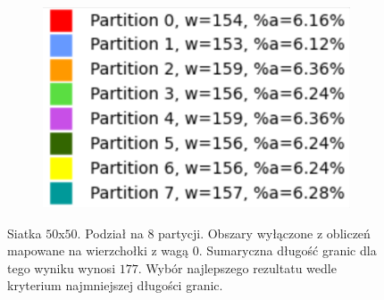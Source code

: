 \begin{figure}[h]
\begin{subfigure}{.33\textwidth}
    \caption[short]{}
\end{subfigure}%
\begin{subfigure}{.33\textwidth}
    \centering
    \includegraphics[width=0.9\linewidth]{images/results/m_k/with/4/results}
    \caption[short]{}
\end{subfigure}
\caption{Siatka $50$x$50$. Podział na $8$ partycji. Obszary wyłączone z obliczeń mapowane na wierzchołki z wagą $0$.
Sumaryczna długość granic dla tego wyniku wynosi $177$.
Wybór najlepszego rezultatu wedle kryterium najmniejszej długości granic.}
\label{result:4}
\end{figure}

